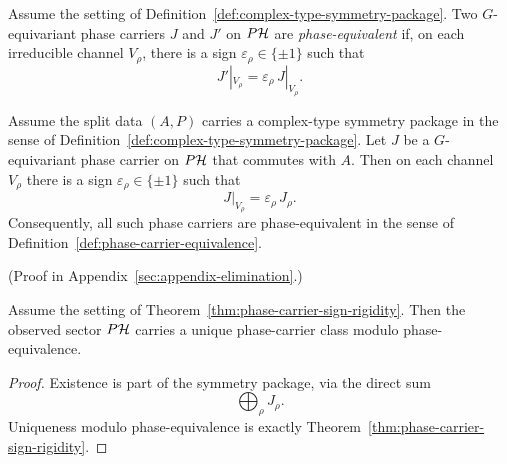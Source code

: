 \begin{definition}
\label{def:phase-carrier-equivalence}
Assume the setting of Definition~\ref{def:complex-type-symmetry-package}. Two
$G$-equivariant phase carriers $J$ and $J'$ on $P\mathcal{H}$ are
\emph{phase-equivalent} if, on each irreducible channel $V_{\rho}$, there is a
sign $\varepsilon_{\rho}\in\{\pm 1\}$ such that
\[
J'|_{V_{\rho}}=\varepsilon_{\rho}\,J|_{V_{\rho}}.
\]
\end{definition}

\begin{theorem}
\label{thm:phase-carrier-sign-rigidity}
Assume the split data $(A,P)$ carries a complex-type symmetry package in the
sense of Definition~\ref{def:complex-type-symmetry-package}. Let $J$ be a
$G$-equivariant phase carrier on $P\mathcal{H}$ that commutes with $A$. Then on each
channel $V_{\rho}$ there is a sign $\varepsilon_{\rho}\in\{\pm1\}$ such that
\[
J|_{V_{\rho}}=\varepsilon_{\rho}\,J_{\rho}.
\]
Consequently, all such phase carriers are phase-equivalent in the sense of
Definition~\ref{def:phase-carrier-equivalence}.
\end{theorem}

(Proof in Appendix~\ref{sec:appendix-elimination}.)

\begin{corollary}
\label{cor:forced-phase-carrier-class}
Assume the setting of Theorem~\ref{thm:phase-carrier-sign-rigidity}. Then the
observed sector $P\mathcal{H}$ carries a unique phase-carrier class modulo
phase-equivalence.
\end{corollary}

\begin{proof}
Existence is part of the symmetry package, via the direct sum
\[
\bigoplus_{\rho} J_{\rho}.
\]
Uniqueness modulo phase-equivalence is exactly
Theorem~\ref{thm:phase-carrier-sign-rigidity}.
\end{proof}


